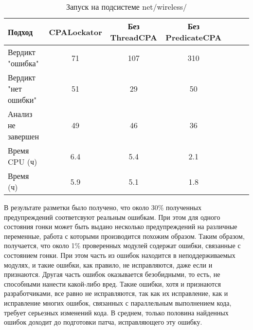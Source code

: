 \begin{center}
  \begin{table}[h]\footnotesize
    \caption{Запуск на подсистеме net/wireless/}
    \label{table-linux-full}
    \begin{tabular}{ | l | c | c | c | c | c | c |}
      \hline
      Подход         & CPALockator   & Без ThreadCPA & Без PredicateCPA \\ \hline
      Вердикт "ошибка" & 71    & 107        & 310 \\ 
      Вердикт "нет ошибки"  & 51      & 29        & 50  \\ 
      Анализ не завершен       & 49     & 46         & 36    \\ \hline
      Время CPU (ч)   & 6.4 & 5.4     & 2.1  \\ 
      Время (ч)  & 5.9 & 5.1     & 1.8   \\
      \hline
    \end{tabular}
  \end{table}
\end{center}

В результате разметки было получено, что около 30\% полученных предупреждений соответсвуют реальным ошибкам. 
При этом для одного состояния гонки может быть выдано несколько предупреждений на различные переменные, работа с которыми производится похожим образом.
Таким образом, получается, что около 1\% проверенных модулей содержат ошибки, связанные с состоянием гонки.
При этом часть из ошибок находится в неподдерживаемых модулях, и такие ошибки, как правило, не исправляются, даже если и признаются. 
Другая часть ошибок оказывается безобидными, то есть, не способными нанести какой-либо вред.
Такие ошибки, хотя и признаются разработчиками, все равно не исправляются, так как их исправление, как и исправление многих ошибок, связанных с параллельным выполнением кода, требует серьезных изменений кода.
В среднем, только половина найденных ошибок доходит до подготовки патча, исправляющего эту ошибку.

